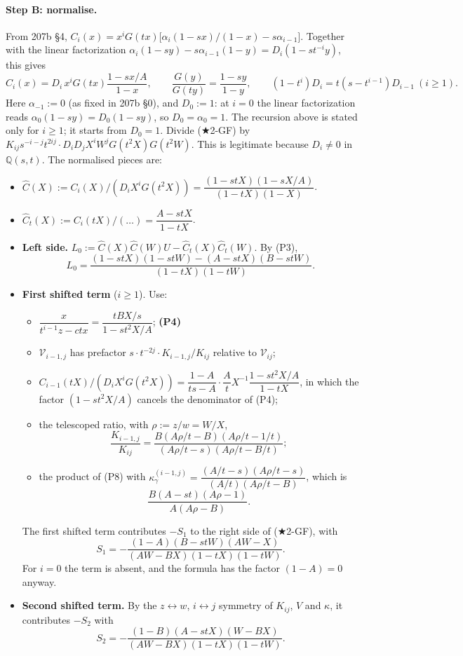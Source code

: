 \documentclass[11pt]{amsart}
\theoremstyle{remark}
\newcommand{\cV}{\mathcal{V}}
\newcommand{\plab}[1]{\textbf{(#1)}}
\begin{document}
\paragraph{Step B: normalise.} From 207b \S4, $C_i(x)=x^iG(tx)\bigl[\alpha_i(1-sx)/(1-x)-s\alpha_{i-1}\bigr]$. Together with the linear factorization $\alpha_i(1-sy)-s\alpha_{i-1}(1-y)=D_i(1-st^{-i}y)$, this gives
\[
C_i(x)=D_i\,x^iG(tx)\frac{1-sx/A}{1-x},\qquad \frac{G(y)}{G(ty)}=\frac{1-sy}{1-y},\qquad (1-t^i)D_i=t(s-t^{i-1})D_{i-1}\ (i\ge1).
\]
Here $\alpha_{-1}:=0$ (as fixed in 207b \S0), and $D_0:=1$: at $i=0$ the linear factorization reads $\alpha_0(1-sy)=D_0(1-sy)$, so $D_0=\alpha_0=1$. The recursion above is stated only for $i\ge1$; it starts from $D_0=1$.
Divide ($\bigstar$2-GF) by $K_{ij}s^{-i-j}t^{2ij}\cdot D_iD_jX^iW^jG(t^2X)G(t^2W)$. This is legitimate because $D_i\ne0$ in $\mathbb{Q}(s,t)$. The normalised pieces are:
\begin{itemize}
\item $\hat C(X):=C_i(X)/(D_iX^iG(t^2X))=\dfrac{(1-stX)(1-sX/A)}{(1-tX)(1-X)}$.
\item $\hat C_t(X):=C_i(tX)/(\dots)=\dfrac{A-stX}{1-tX}$.
\item \textbf{Left side.} $L_0:=\hat C(X)\hat C(W)U-\hat C_t(X)\hat C_t(W)$. By (P3),
\[
L_0=\frac{(1-stX)(1-stW)-(A-stX)(B-stW)}{(1-tX)(1-tW)}.
\]
\item \textbf{First shifted term} ($i\ge1$). Use:
\begin{itemize}
\item $\dfrac{x}{t^{i-1}z-ctx}=\dfrac{tBX/s}{1-st^2X/A}$; \hfill\plab{P4}
\item $\cV_{i-1,j}$ has prefactor $s\cdot t^{-2j}\cdot K_{i-1,j}/K_{ij}$ relative to $\cV_{ij}$;
\item $C_{i-1}(tX)/(D_iX^iG(t^2X))=\dfrac{1-A}{ts-A}\cdot\dfrac At X^{-1}\dfrac{1-st^2X/A}{1-tX}$, in which the factor $(1-st^2X/A)$ cancels the denominator of (P4);
\item the telescoped ratio, with $\rho:=z/w=W/X$,
\[
\frac{K_{i-1,j}}{K_{ij}}=\frac{B(A\rho/t-B)(A\rho/t-1/t)}{(A\rho/t-s)(A\rho/t-B/t)};\tag{P8}
\]
\item the product of (P8) with $\kappa_\gamma^{(i-1,j)}=\dfrac{(A/t-s)(A\rho/t-s)}{(A/t)(A\rho/t-B)}$, which is
\[
\frac{B(A-st)(A\rho-1)}{A(A\rho-B)}.\tag{P6}
\]
\end{itemize}
The first shifted term contributes $-S_1$ to the right side of ($\bigstar$2-GF), with
\[
S_1=-\frac{(1-A)(B-stW)(AW-X)}{(AW-BX)(1-tX)(1-tW)}.
\]
For $i=0$ the term is absent, and the formula has the factor $(1-A)=0$ anyway.
\item \textbf{Second shifted term.} By the $z\leftrightarrow w$, $i\leftrightarrow j$ symmetry of $K_{ij}$, $V$ and $\kappa$, it contributes $-S_2$ with
\[
S_2=-\frac{(1-B)(A-stX)(W-BX)}{(AW-BX)(1-tX)(1-tW)}.
\]
\end{itemize}
\end{document}

